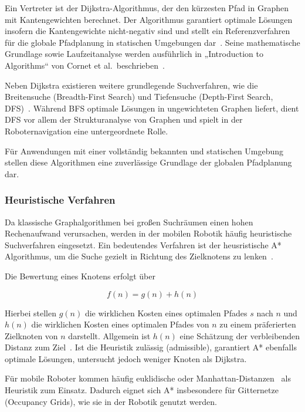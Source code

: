 \documentclass[
  a4paper,
  12pt,
  DIV=12,        %
  parskip=half,  %
  headings=small %
]{scrartcl}
\theoremstyle{definition}
\theoremstyle{definition}
\begin{document}
Ein Vertreter ist der Dijkstra-Algorithmus, der den kürzesten Pfad in Graphen
mit Kantengewichten berechnet. Der Algorithmus garantiert optimale Lösungen
insofern die Kantengewichte nicht-negativ sind und
stellt ein Referenzverfahren für die globale Pfadplanung in statischen
Umgebungen dar~\cite{Dijkstra}. Seine mathematische Grundlage sowie Laufzeitanalyse werden
ausführlich in „Introduction to Algorithms“ von Cornet et al.\ beschrieben~\cite{IntroToAlgs}.

Neben Dijkstra existieren weitere grundlegende Suchverfahren, wie die
Breitensuche (Breadth-First Search) und Tiefensuche (Depth-First Search,
DFS)~\cite{IntroToAlgs}.
Während BFS optimale Lösungen in ungewichteten Graphen liefert, dient DFS vor
allem der Strukturanalyse von Graphen und spielt in der Roboternavigation eine
untergeordnete Rolle.

Für Anwendungen mit einer vollständig bekannten und statischen Umgebung stellen
diese Algorithmen eine zuverlässige Grundlage der globalen Pfadplanung dar.

\subsubsection{Heuristische Verfahren}

Da klassische Graphalgorithmen bei großen Suchräumen einen hohen Rechenaufwand
verursachen, werden in der mobilen Robotik häufig heuristische Suchverfahren
eingesetzt. Ein bedeutendes Verfahren ist der heusristische A* Algorithmus, um
die Suche gezielt in Richtung des Zielknotens zu lenken~\cite{IntroToAlgs,AStar}.

Die Bewertung eines Knotens erfolgt über

\begin{equation}
f\left(n\right) = g\left(n\right) + h\left(n\right)
\end{equation}

Hierbei stellen $g(n)$ die wirklichen Kosten eines optimalen Pfades $s$ nach
$n$ und $h(n)$ die wirklichen Kosten eines optimalen Pfades von $n$ zu einem
präferierten Zielknoten von $n$ darstellt. Allgemein ist $h(n)$ eine Schätzung
der verbleibenden Distanz zum Ziel~\cite{AStar}. Ist die Heuristik zulässig (admissible),
garantiert A* ebenfalls optimale Lösungen, untersucht jedoch weniger Knoten als
Dijkstra.

Für mobile Roboter kommen häufig euklidische oder Manhattan-Distanzen~\cite{IntroToAlgs} als
Heuristik zum Einsatz. Dadurch eignet sich A* insbesondere für Gitternetze
(Occupancy Grids), wie sie in der Robotik genutzt werden\cite{RoboticMapping}.
\end{document}
